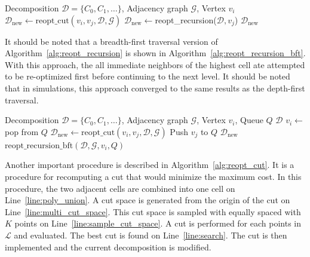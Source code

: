 \documentclass[../main.tex]{subfiles}
\begin{document}
\begin{algorithm}
	\caption{$\text{reopt\_recursion}(\mathcal{D}, \mathcal{G}, v_i)$}
	\label{alg:reopt_recursion}
	\begin{algorithmic}[1]
		\REQUIRE Decomposition $\mathcal{D}=\{C_0,C_1,\ldots\}$, Adjacency graph $\mathcal{G}$, Vertex $v_i$
					\STATE $\mathcal{D}_{\text{new}}\gets\text{reopt\_cut}(v_i,v_j,\mathcal{D},\mathcal{G})$ \label{line:multi_reopt_cut}
						\STATE $\mathcal{D}_{\text{new}}\gets$reopt\_recursion($\mathcal{D},v_j$)\label{line:multi_recursive_call}
					\ENDIF
					\RETURN $\mathcal{D}_{\text{new}}$
				\ENDIF
			\ENDFOR
	\end{algorithmic}
\end{algorithm}

It should be noted that a breadth-first traversal version of Algorithm~\ref{alg:reopt_recursion} is shown in Algorithm~\ref{alg:reopt_recursion_bft}. With this approach, the all immediate neighbors of the highest cell ate attempted to be re-optimized first before continuing to the next level. It should be noted that in simulations, this approach converged to the same results as the depth-first traversal.

\begin{algorithm}
	\caption{$\text{reopt\_recursion\_bft}(\mathcal{D}, \mathcal{G}, v_i, Q)$}
	\label{alg:reopt_recursion_bft}
	\begin{algorithmic}[1]
		\REQUIRE Decomposition $\mathcal{D}=\{C_0,C_1,\ldots\}$, Adjacency graph $\mathcal{G}$, Vertex $v_i$, Queue $Q$
				\RETURN $\mathcal{D}$
			\ENDIF
			\STATE $v_i\gets$ pop from $Q$
					\STATE $\mathcal{D}_{\text{new}}\gets\text{reopt\_cut}(v_i,v_j,\mathcal{D},\mathcal{G})$ \label{line:multi_reopt_cut}
						\STATE Push $v_j$ to $Q$
					\ELSE
						\RETURN $\mathcal{D}_{\text{new}}$
					\ENDIF
				\ENDIF
			\ENDFOR
			\RETURN $\text{reopt\_recursion\_bft}(\mathcal{D}, \mathcal{G}, v_i, Q)$
	\end{algorithmic}
\end{algorithm}


Another important procedure is described in Algorithm~\ref{alg:reopt_cut}. It is a procedure for recomputing a cut that would minimize the maximum cost. In this procedure, the two adjacent cells are combined into one cell on Line~\ref{line:poly_union}. A cut space is generated from the origin of the cut on Line~\ref{line:multi_cut_space}. This cut space is sampled with equally spaced with $K$ points on Line~\ref{line:sample_cut_space}. A cut is performed for each points in $\mathcal{L}$ and evaluated. The best cut is found on Line~\ref{line:search}. The cut is then implemented and the current decomposition is modified.
\end{document}
